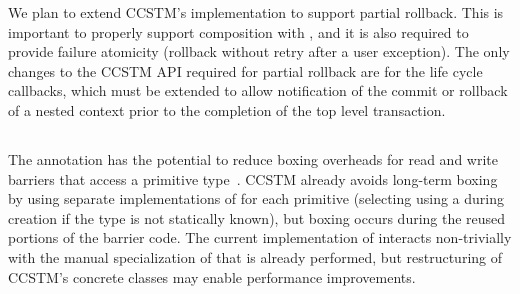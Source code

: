 We plan to extend CCSTM's implementation to support partial rollback.
This is important to properly support composition with , and
it is also required to provide failure atomicity (rollback without retry
after a user exception).  The only changes to the CCSTM API required
for partial rollback are for the life cycle callbacks, which must be
extended to allow notification of the commit or rollback of a nested
context prior to the completion of the top level transaction.

\subsection{}

The  annotation has the potential to reduce
boxing overheads for read and write barriers that access a primitive
type~\cite{dragos09specialization}.  CCSTM already avoids long-term
boxing by using separate implementations of  for each primitive
(selecting using a  during creation if the type is
not statically known), but boxing occurs during the reused portions of
the barrier code.  The current implementation of 
interacts non-trivially with the manual specialization of 
that is already performed, but restructuring of CCSTM's concrete classes
may enable performance improvements.

